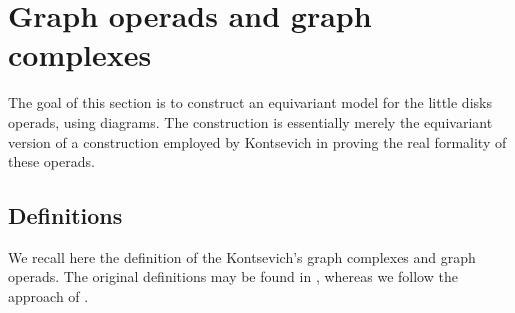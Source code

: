 \documentclass[a4paper]{amsart}
\theoremstyle{plain}
\theoremstyle{definition}
\begin{document}
\section{Graph operads and graph complexes}\label{sec:graphs}
The goal of this section is to construct an equivariant model for the little disks operads, using diagrams.
The construction is essentially merely the equivariant version of a construction employed by Kontsevich \cite{K2} in proving the real formality of these operads.

\subsection{Definitions}\label{sec:GraDefinitions}
We recall here the definition of the Kontsevich's graph complexes and graph operads. The original definitions may be found in \cite{K2, Knoncomm}, whereas we follow the approach of \cite{Will}.
\end{document}
